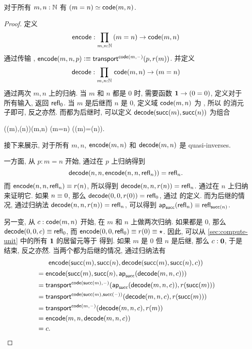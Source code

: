 \begin{thm}\label{thm:path-nat}
  对于所有 $m,n:\mathbb{N}$ 有 $(m=n) \simeq \mathsf{code}(m,n)$.
\end{thm}
\begin{proof}
  定义
  \[ \encode : \prd{m,n:\N} (m=n) \to \code(m,n) \]
  通过传输 , $\mathsf{encode}(m,n,p) \vcentcolon\equiv \mathsf{transport}^{\mathsf{code}(m,{\mathord{\hspace{1pt}\text{--}\hspace{1pt}}})}(p,r(m))$.
  并定义
  \[ \decode : \prd{m,n:\N} \code(m,n) \to (m=n) \]
  通过两次 $m,n$ 上的归纳.
  当 $m$ 和 $n$ 都是 $0$ 时, 需要函数 $\mathbf{1} \to (0=0)$, 定义对于所有输入, 返回 $\mathsf{refl}_{0}$.
  当 $m$ 是后继而 $n$ 是 $0$, 定义域 $\mathsf{code}(m,n)$ 为 \emptyt, 所以 \emptyt 的消元子即可, 反之亦然.
  而都为后继时, 可以定义 $\mathsf{decode}(\mathsf{succ}(m),\mathsf{succ}(n))$ 为组合
  \begin{narrowmultline*}
    \code(\suc(m),\suc(n))\jdeq\code(m,n)
     \narrowbreak
    (m=n)
    \xrightarrow{\apfunc{\suc}}
    (\suc(m)=\suc(n)).
  \end{narrowmultline*}
  接下来展示, 对于所有 $m,n$, $\mathsf{encode}(m,n)$ 和 $\mathsf{decode}(m,n)$ 是 quasi-inverses.

  一方面, 从 $p:m=n$ 开始, 通过在 $p$ 上归纳得到
  \[\mathsf{decode}(n,n,\mathsf{encode}(n,n,\mathsf{refl}_{n}))=\mathsf{refl}_{n}.\]
  而 $\mathsf{encode}(n,n,\mathsf{refl}_{n}) \equiv r(n)$, 所以得到 $\mathsf{decode}(n,n,r(n)) =\mathsf{refl}_{n}$.
  通过在 $n$ 上归纳来证明它.
  如果 $n\equiv 0$, 那么 $\mathsf{decode}(0,0,r(0)) =\mathsf{refl}_{0}$, 通过 \decode 的定义.
  而为后继的情况, 通过归纳法 $\mathsf{decode}(n,n,r(n)) = \mathsf{refl}_{n}$, 可以得到 $\mathsf{ap}_{\mathsf{succ}}(\mathsf{refl}_{n}) \equiv \mathsf{refl}_{\mathsf{succ}(n)}$.

  另一变, 从 $c:\mathsf{code}(m,n)$ 开始, 在 $m$ 和 $n$ 上做两次归纳.
  如果都是 $0$, 那么 $\mathsf{decode}(0,0,c) \equiv \mathsf{refl}_{0}$, 而 $\mathsf{encode}(0,0,\mathsf{refl}_{0})\equiv r(0) \equiv \star$.
  因此, 可以从 \cref{sec:compute-unit} 中的所有 $\mathbf{1}$ 的居留元等于 \ttt 得到.
  如果 $m$ 是 $0$ 但 $n$ 是后继, 那么 $c:\mathbf{0}$, 于是结束, 反之亦然.
  当两个都为后继的情况, 通过归纳法有
  \begin{multline*}
    \mathsf{encode}(\mathsf{succ}(m),\mathsf{succ}(n),\mathsf{decode}(\mathsf{succ}(m),\mathsf{succ}(n),c))\\
    \begin{aligned}
    &= \mathsf{encode}(\mathsf{succ}(m),\mathsf{succ}(n),\mathsf{ap}_{\mathsf{succ}}(\mathsf{decode}(m,n,c)))\\
    &= \mathsf{transport}^{\mathsf{code}(\mathsf{succ}(m),{\mathord{\hspace{1pt}\text{--}\hspace{1pt}}})}(\mathsf{ap}_{\mathsf{succ}}(\mathsf{decode}(m,n,c)),r(\mathsf{succ}(m)))\\
    &= \mathsf{transport}^{\mathsf{code}(\mathsf{succ}(m),\mathsf{succ}({\mathord{\hspace{1pt}\text{--}\hspace{1pt}}}))}(\mathsf{decode}(m,n,c),r(\mathsf{succ}(m)))\\
    &= \mathsf{transport}^{\mathsf{code}(m,{\mathord{\hspace{1pt}\text{--}\hspace{1pt}}})}(\mathsf{decode}(m,n,c),r(m))\\
    &= \mathsf{encode}(m,n,\mathsf{decode}(m,n,c))\\
    &= c.
  \end{aligned}
  \end{multline*}
\end{proof}

